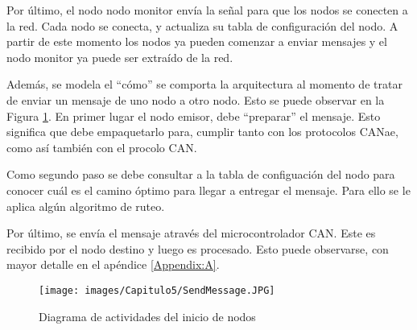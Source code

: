 Por último,  el nodo nodo monitor envía la señal para que los nodos se conecten a
la red. Cada nodo se conecta, y actualiza su tabla de configuración del nodo. A partir
de este momento los nodos ya pueden comenzar a enviar mensajes y el nodo monitor ya
puede ser extraído de la red. 

Además, se modela el ``cómo'' se comporta la arquitectura al
momento de tratar de enviar un mensaje de uno nodo a otro nodo. Esto se puede
observar en la Figura \ref{fig:SendMessage}. En primer lugar el nodo emisor,
debe ``preparar'' el mensaje. Esto significa que debe empaquetarlo para,
cumplir tanto con los protocolos CANae, como así también con el procolo CAN.

Como segundo paso se debe consultar a la tabla de configuación del nodo para conocer
cuál es el camino óptimo para llegar a entregar el mensaje. Para ello se le aplica algún
algoritmo de ruteo.

Por último, se envía el mensaje através del microcontrolador CAN. Este es recibido por el nodo
destino y luego es procesado. Esto puede observarse, con mayor detalle en el
apéndice \ref{Appendix:A}. 

\begin{figure}[h!]
 \centering
 \texttt{[image: images/Capitulo5/SendMessage.JPG]}
  \caption{Diagrama de actividades del inicio de nodos}
  \label{fig:SendMessage}
\end{figure}
